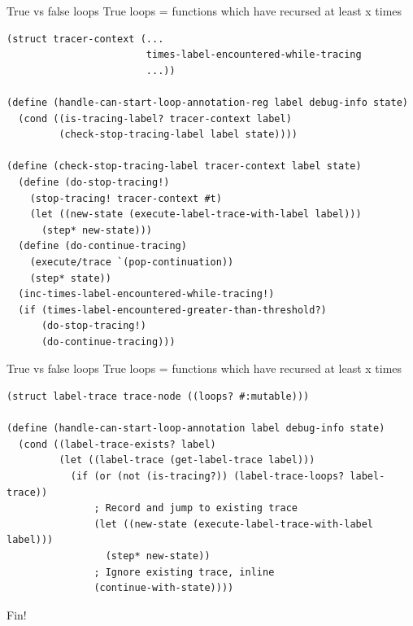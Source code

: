 \documentclass{beamer}
\begin{document}
\begin{frame}[fragile]{True vs false loops}
True loops = functions which have recursed at least x times
\begin{lstlisting}[basicstyle = \tiny\ttfamily, escapechar = £]
(struct tracer-context (...
                        times-label-encountered-while-tracing
                        ...))

(define (handle-can-start-loop-annotation-reg label debug-info state)
  (cond ((is-tracing-label? tracer-context label)
         (check-stop-tracing-label label state))))
         
(define (check-stop-tracing-label tracer-context label state)
  (define (do-stop-tracing!)
    (stop-tracing! tracer-context #t)
    (let ((new-state (execute-label-trace-with-label label)))
      (step* new-state)))
  (define (do-continue-tracing)
    (execute/trace `(pop-continuation))
    (step* state))
  (inc-times-label-encountered-while-tracing!)
  (if (times-label-encountered-greater-than-threshold?)
      (do-stop-tracing!)
      (do-continue-tracing)))
\end{lstlisting}
\end{frame}

\begin{frame}[fragile]{True vs false loops}
True loops = functions which have recursed at least x times
\begin{lstlisting}[basicstyle = \scriptsize\ttfamily, escapechar = £]
(struct label-trace trace-node ((loops? #:mutable)))
  
(define (handle-can-start-loop-annotation label debug-info state)
  (cond ((label-trace-exists? label)
         (let ((label-trace (get-label-trace label)))
           (if (or (not (is-tracing?)) (label-trace-loops? label-trace))
               ; Record and jump to existing trace
               (let ((new-state (execute-label-trace-with-label label)))
                 (step* new-state))
               ; Ignore existing trace, inline
               (continue-with-state))))
\end{lstlisting}
\end{frame}

\begin{frame}
\centering
\Huge{Fin!}
\end{frame}
\end{document}
